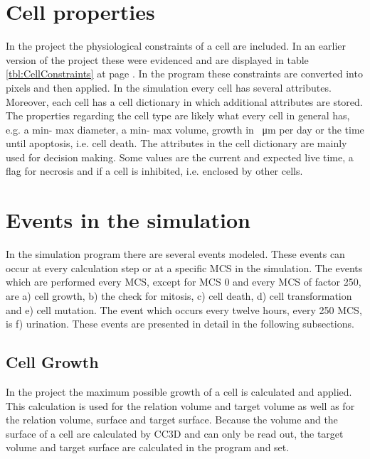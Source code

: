 \section{Cell properties}
In the project the physiological constraints of a cell are included. In an earlier version of the project these were evidenced \cite{Torelli2017} and are displayed in table \ref{tbl:CellConstraints} at page \pageref{tbl:CellConstraints}. In the program these constraints are converted into pixels and then applied. \newline
In the simulation every cell has several attributes. Moreover, each cell has a cell dictionary in which additional attributes are stored. The properties regarding the cell type are likely what every cell in general has, e.g. a min- max diameter, a min- max volume, growth in \SI{}{\micro\metre} per day or the time until apoptosis, i.e. cell death. \newline
The attributes in the cell dictionary are mainly used for decision making. Some values are the current and expected live time, a flag for necrosis and if a cell is inhibited, i.e. enclosed by other cells. \newline


\section{Events in the simulation}
In the simulation program there are several events modeled. These events can occur at every calculation step or at a specific \ac{MCS} in the simulation. \newline
The events which are performed every \ac{MCS}, except for \ac{MCS} 0 and every \ac{MCS} of factor 250, are a) cell growth, b) the check for mitosis, c) cell death, d) cell transformation and e) cell mutation. The event which occurs every twelve hours, every 250 \ac{MCS}, is f) urination. These events are presented in detail in the following subsections.

\subsection{Cell Growth}
In the project the maximum possible growth of a cell is calculated and applied. This calculation is used for the relation volume and target volume as well as for the relation volume, surface and target surface. Because the volume and the surface of a cell are calculated by \ac{CC3D} and can only be read out, the target volume and target surface are calculated in the program and set.

